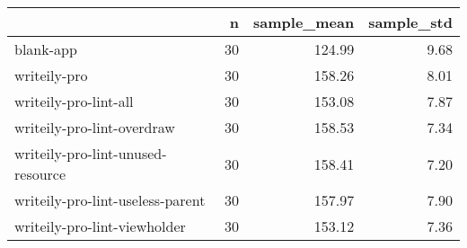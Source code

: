 \begin{tabular}{lrrr}
\toprule
{} &   n &  sample\_mean &  sample\_std \\
\midrule
blank-app                         &  30 &       124.99 &        9.68 \\
writeily-pro                      &  30 &       158.26 &        8.01 \\
writeily-pro-lint-all             &  30 &       153.08 &        7.87 \\
writeily-pro-lint-overdraw        &  30 &       158.53 &        7.34 \\
writeily-pro-lint-unused-resource &  30 &       158.41 &        7.20 \\
writeily-pro-lint-useless-parent  &  30 &       157.97 &        7.90 \\
writeily-pro-lint-viewholder      &  30 &       153.12 &        7.36 \\
\bottomrule
\end{tabular}
